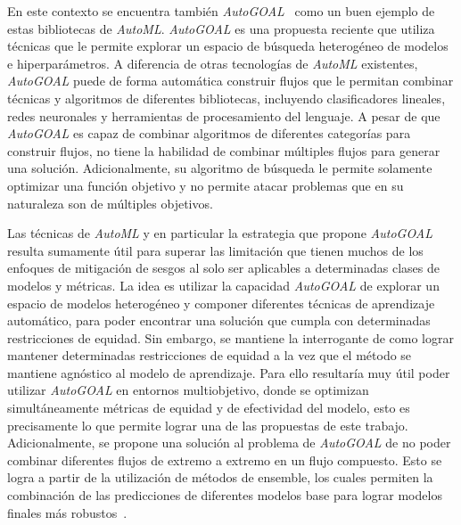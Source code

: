 
En este contexto se encuentra también \emph{AutoGOAL}~\parencite{autogoal} como un buen ejemplo de estas bibliotecas de \emph{AutoML}.
\emph{AutoGOAL} es una propuesta reciente que utiliza técnicas que le permite explorar un espacio de búsqueda heterogéneo de modelos e hiperparámetros.
A diferencia de otras tecnologías de \emph{AutoML} existentes, \emph{AutoGOAL} puede de forma automática construir flujos que le permitan combinar técnicas y algoritmos de diferentes bibliotecas, incluyendo clasificadores lineales, redes neuronales y herramientas de procesamiento del lenguaje.
A pesar de que \emph{AutoGOAL} es capaz de combinar algoritmos de diferentes categorías para construir flujos, no tiene la habilidad de combinar múltiples flujos para generar una solución.
Adicionalmente, su algoritmo de búsqueda le permite solamente optimizar una función objetivo y no permite atacar problemas que en su naturaleza son de múltiples objetivos.


Las técnicas de \emph{AutoML} y en particular la estrategia que propone \emph{AutoGOAL} resulta sumamente útil para superar las limitación que tienen muchos de los enfoques de mitigación de sesgos al solo ser aplicables a determinadas clases de modelos y métricas.
La idea es utilizar la capacidad \emph{AutoGOAL} de explorar un espacio de modelos heterogéneo y componer diferentes técnicas de aprendizaje automático, para poder encontrar una solución que cumpla con determinadas restricciones de equidad.
Sin embargo, se mantiene la interrogante de como lograr mantener determinadas restricciones de equidad a la vez que el método se mantiene agnóstico al modelo de aprendizaje.
Para ello resultaría muy útil poder utilizar \emph{AutoGOAL} en entornos multiobjetivo, donde se optimizan simultáneamente métricas de equidad y de efectividad del modelo, esto es precisamente lo que permite lograr una de las propuestas de este trabajo.
Adicionalmente, se propone una solución al problema de \emph{AutoGOAL} de no poder combinar diferentes flujos de extremo a extremo en un flujo compuesto.
Esto se logra a partir de la utilización de métodos de ensemble, los cuales permiten la combinación de las predicciones de diferentes modelos base para lograr modelos finales más robustos~\parencite{polikar2006ensemble}.


